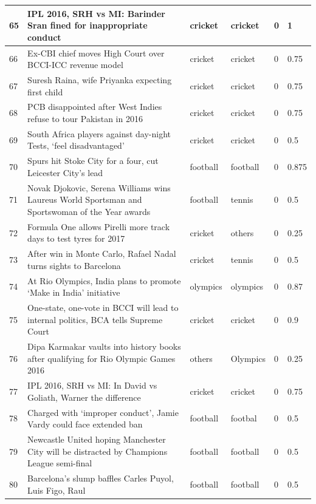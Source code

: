 \documentclass[12pt]{article}
\begin{document}
\begin{longtable}{|p{2.0cm} | p{6.0cm} | p{2.0cm} |p{2.0cm}| p{2.0cm}|p{2.0cm}|}
65 & IPL 2016, SRH vs MI: Barinder Sran fined for inappropriate conduct & cricket & cricket & 0 & 1 \\\hline													
66 & Ex-CBI chief moves High Court over BCCI-ICC revenue model & cricket & cricket & 0 & 0.75 \\\hline													
67 & Suresh Raina, wife Priyanka expecting first child & cricket & cricket & 0 & 0.75 \\\hline													
68 & PCB disappointed after West Indies refuse to tour Pakistan in 2016 & cricket & cricket & 0 & 0.75 \\\hline													
69 & South Africa players against day-night Tests, ‘feel disadvantaged’ & cricket & cricket & 0 & 0.5 \\\hline													
70 & Spurs hit Stoke City for a four, cut Leicester City’s lead & football & football & 0 & 0.875 \\\hline													
71 & Novak Djokovic, Serena Williams wins Laureus World Sportsman and Sportswoman of the Year awards & football & tennis & 0 & 0.5 \\\hline													
72 & Formula One allows Pirelli more track days to test tyres for 2017 & cricket & others & 0 & 0.25 \\\hline													
73 & After win in Monte Carlo, Rafael Nadal turns sights to Barcelona & cricket & tennis & 0 & 0.5 \\\hline													
74 & At Rio Olympics, India plans to promote ‘Make in India’ initiative & olympics & olympics & 0 & 0.87 \\\hline													
75 & One-state, one-vote in BCCI will lead to internal politics, BCA tells Supreme Court & cricket & cricket & 0 & 0.9 \\\hline													
76 & Dipa Karmakar vaults into history books after qualifying for Rio Olympic Games 2016 & others & Olympics & 0 & 0.25 \\\hline													
77 & IPL 2016, SRH vs MI: In David vs Goliath, Warner the difference & cricket & cricket & 0 & 0.75 \\\hline													
78 & Charged with ‘improper conduct’, Jamie Vardy could face extended ban & football & footbal & 0 & 0.5 \\\hline													
79 & Newcastle United hoping Manchester City will be distracted by Champions League semi-final & football & football & 0 & 0.5 \\\hline													
80 & Barcelona’s slump baffles Carles Puyol, Luis Figo, Raul & football & football & 0 & 0.5 \\\hline													

\end{longtable}
\end{document}
